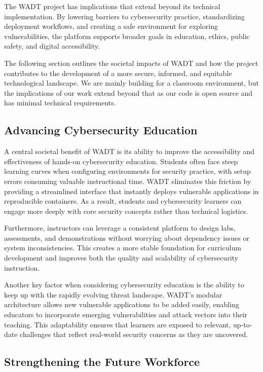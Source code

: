 \documentclass[12pt,titlepage]{article}
\begin{document}
The WADT project has implications that extend beyond its technical implementation. By lowering barriers to cybersecurity practice, standardizing deployment workflows, and creating a safe environment for exploring vulnerabilities, the platform supports broader goals in education, ethics, public safety, and digital accessibility.

The following section outlines the societal impacts of WADT and how the project contributes to the development of a more secure, informed, and equitable technological landscape. We are mainly building for a classroom environment, but the implications of our work extend beyond that as our code is open source and has minimal technical requirements.

\subsection{Advancing Cybersecurity Education}

A central societal benefit of WADT is its ability to improve the accessibility and effectiveness of hands-on cybersecurity education. Students often face steep learning curves when configuring environments for security practice, with setup errors consuming valuable instructional time. WADT eliminates this friction by providing a streamlined interface that instantly deploys vulnerable applications in reproducible containers. As a result, students and cybersecurity learners can engage more deeply with core security concepts rather than technical logistics.

Furthermore, instructors can leverage a consistent platform to design labs, assessments, and demonstrations without worrying about dependency issues or system inconsistencies. This creates a more stable foundation for curriculum development and improves both the quality and scalability of cybersecurity instruction. 

Another key factor when considering cybersecurity education is the ability to keep up with the rapidly evolving threat landscape. WADT's modular architecture allows new vulnerable applications to be added easily, enabling educators to incorporate emerging vulnerabilities and attack vectors into their teaching. This adaptability ensures that learners are exposed to relevant, up-to-date challenges that reflect real-world security concerns as they are uncovered. 

\subsection{Strengthening the Future Workforce}
\end{document}
